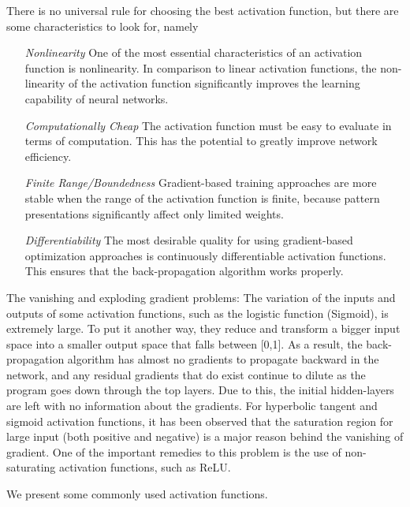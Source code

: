 \documentclass{tufte-handout}
\begin{document}
\noindent There is no universal rule for choosing the best activation function, but there are some characteristics to look for, namely
\begin{enumerate}
  \item[\it Nonlinearity] One of the most essential characteristics
of an activation function is nonlinearity. In comparison
to linear activation functions, the non-linearity of the
activation function significantly improves the learning
capability of neural networks. 
\item[\it Computationally Cheap] The activation function must
be easy to evaluate in terms of computation. This has
the potential to greatly improve network efficiency.
\item[\it Finite Range/Boundedness] Gradient-based training approaches are more stable when the range of the activation function is finite, because pattern presentations
significantly affect only limited weights. 
\item[\it Differentiability] The most desirable quality for using
gradient-based optimization approaches is continuously
differentiable activation functions. This ensures that the
back-propagation algorithm works properly. 
\end{enumerate}
\begin{remark} 
  The vanishing and exploding gradient problems: The variation
of the inputs and outputs of some activation functions,
such as the logistic function (Sigmoid), is extremely
large. To put it another way, they reduce and transform
a bigger input space into a smaller output space that
falls between [0,1]. As a result, the back-propagation
algorithm has almost no gradients to propagate backward
in the network, and any residual gradients that do exist
continue to dilute as the program goes down through the
top layers. Due to this, the initial hidden-layers are left
with no information about the gradients. For hyperbolic
tangent and sigmoid activation functions, it has been
observed that the saturation region for large input (both
positive and negative) is a major reason behind the
vanishing of gradient. One of the important remedies
to this problem is the use of non-saturating activation
functions, such as ReLU.
\end{remark}
We present some commonly used activation functions.
\end{document}
